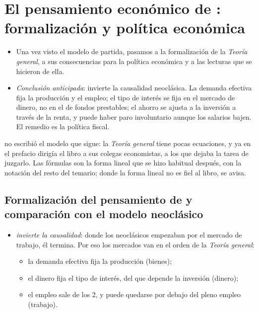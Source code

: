 \documentclass[11pt]{article}
\begin{document}
\section{El pensamiento económico de :\cortetitulo{} formalización y política económica}\label{sec:formalizacion}

\begin{itemize}
\item Una vez visto el modelo de partida, pasamos a la formalización de la \emph{Teoría general}, a sus consecuencias para la política económica y a las lecturas que se hicieron de ella.
\item \emph{Conclusión anticipada}:  invierte la causalidad neoclásica. La demanda efectiva fija la producción y el empleo; el tipo de interés se fija en el mercado de dinero, no en el de fondos prestables; el ahorro se ajusta a la inversión a través de la renta, y puede haber paro involuntario aunque los salarios bajen. El remedio es la política fiscal.
\end{itemize}

\begin{anotaciones}
 no escribió el modelo que sigue: la \emph{Teoría general} tiene pocas ecuaciones, y ya en el prefacio dirigía el libro a sus colegas economistas, a los que dejaba la tarea de juzgarlo\nocite{Keynes1936}. Las fórmulas son la forma lineal que se hizo habitual después, con la notación del resto del temario; donde la forma lineal no es fiel al libro, se avisa.
\end{anotaciones}

\subsection{Formalización del pensamiento de  y comparación con el modelo neoclásico}\label{sec:formalizacion-keynes}

\begin{itemize}
\item {} \emph{invierte la causalidad}: donde los neoclásicos empezaban por el mercado de trabajo, él termina. Por eso los mercados van en el orden de la \emph{Teoría general}:
  \begin{itemize}
  \item la demanda efectiva fija la producción (bienes);
  \item el dinero fija el tipo de interés, del que depende la inversión (dinero);
  \item el empleo sale de los 2, y puede quedarse por debajo del pleno empleo (trabajo).
  \end{itemize}
\end{itemize}
\end{document}
